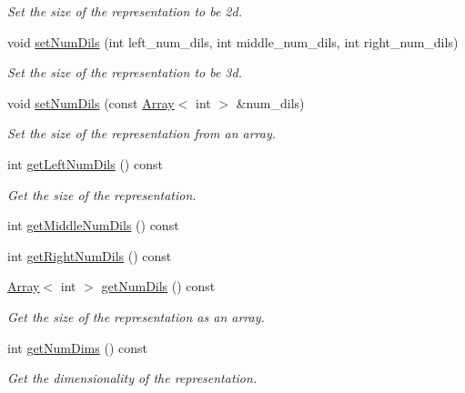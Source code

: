 \begin{DoxyCompactItemize}
\begin{DoxyCompactList}\small\item\em Set the size of the representation to be 2d. \end{DoxyCompactList}\item 
void \mbox{\hyperlink{classHadron_1_1HadronDistOperatorRep__t_a3e971d8bbb79f0024b87f54b4db56083}{set\+Num\+Dils}} (int left\+\_\+num\+\_\+dils, int middle\+\_\+num\+\_\+dils, int right\+\_\+num\+\_\+dils)
\begin{DoxyCompactList}\small\item\em Set the size of the representation to be 3d. \end{DoxyCompactList}\item 
void \mbox{\hyperlink{classHadron_1_1HadronDistOperatorRep__t_ae1052d3d087b32a01f02eda6e802d196}{set\+Num\+Dils}} (const \mbox{\hyperlink{classXMLArray_1_1Array}{Array}}$<$ int $>$ \&num\+\_\+dils)
\begin{DoxyCompactList}\small\item\em Set the size of the representation from an array. \end{DoxyCompactList}\item 
int \mbox{\hyperlink{classHadron_1_1HadronDistOperatorRep__t_a03543084705a6d1349dfd54b79e0aef9}{get\+Left\+Num\+Dils}} () const
\begin{DoxyCompactList}\small\item\em Get the size of the representation. \end{DoxyCompactList}\item 
int \mbox{\hyperlink{classHadron_1_1HadronDistOperatorRep__t_ae196ed58711577cab052c88056654613}{get\+Middle\+Num\+Dils}} () const
\item 
int \mbox{\hyperlink{classHadron_1_1HadronDistOperatorRep__t_ae7f1a0e6b68e409027be775990dd2970}{get\+Right\+Num\+Dils}} () const
\item 
\mbox{\hyperlink{classXMLArray_1_1Array}{Array}}$<$ int $>$ \mbox{\hyperlink{classHadron_1_1HadronDistOperatorRep__t_ae68199c0a94ee84df4223a1ea93787b3}{get\+Num\+Dils}} () const
\begin{DoxyCompactList}\small\item\em Get the size of the representation as an array. \end{DoxyCompactList}\item 
int \mbox{\hyperlink{classHadron_1_1HadronDistOperatorRep__t_a19ee3c70f7ac127fbc534b0f69304b37}{get\+Num\+Dims}} () const
\begin{DoxyCompactList}\small\item\em Get the dimensionality of the representation. \end{DoxyCompactList}\item 

\end{DoxyCompactItemize}
